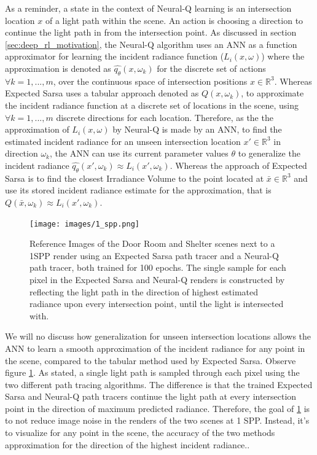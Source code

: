 \documentclass[../dissertation.tex]{subfiles}
\begin{document}
As a reminder, a state in the context of Neural-Q learning is an intersection location $x$ of a light path within the scene. An action is choosing a direction to continue the light path in from the intersection point. As discussed in section \ref{sec:deep_rl_motivation}, the Neural-Q algorithm uses an ANN as a function approximator for learning the incident radiance function ($L_i(x, \omega)$) where the approximation is denoted as $\hat{q_\theta}(x, \omega_k)$ for the discrete set of actions $\forall k = 1, ..., m$, over the continuous space of intersection positions $x \in \mathbb{R}^3$. Whereas Expected Sarsa uses a tabular approach denoted as $Q(x, \omega_k)$,  to approximate the incident radiance function at a discrete set of locations in the scene, using $\forall k = 1, ..., m$ discrete directions for each location. Therefore, as the the approximation of $L_i(x, \omega)$ by Neural-Q is made by an ANN, to find the estimated incident radiance for an unseen intersection location $x' \in \mathbb{R}^3$ in direction $\omega_k$, the ANN can use its current parameter values $\theta$  to generalize the incident radiance $\hat{q_\theta}(x', \omega_k) \approx L_i(x', \omega_k)$. Whereas the approach of Expected Sarsa is to find the closest Irradiance Volume to the point located at $\bar{x} \in \mathbb{R}^3$ and use its stored incident radiance estimate for the approximation, that is $Q(\bar{x}, \omega_k) \approx L_i(x', \omega_k)$. 

\begin{figure}[h]
\centering
\texttt{[image: images/1\_spp.png]}   
\caption{Reference Images of the Door Room and Shelter scenes next to a 1SPP render using an Expected Sarsa path tracer and a Neural-Q path tracer, both trained for 100 epochs. The single sample for each pixel in the Expected Sarsa and Neural-Q renders is constructed by reflecting the light path in the direction of highest estimated radiance upon every intersection point, until the light is intersected with.}
\label{fig:1_spp_max_dir}
\end{figure}

We will no discuss how generalization for unseen intersection locations allows the ANN to learn a smooth approximation of the incident radiance for any point in the scene, compared to the tabular method used by Expected Sarsa. Observe figure \ref{fig:1_spp_max_dir}. As stated, a single light path is sampled through each pixel using the two different path tracing algorithms. The difference is that the trained Expected Sarsa and Neural-Q path tracers continue the light path at every intersection point in the direction of maximum predicted radiance. Therefore, the goal of \ref{fig:1_spp_max_dir} is to not reduce image noise in the renders of the two scenes at 1 SPP. Instead, it's to visualize for any point in the scene, the accuracy of the two methods approximation for the direction of the highest incident radiance.. 
\end{document}
